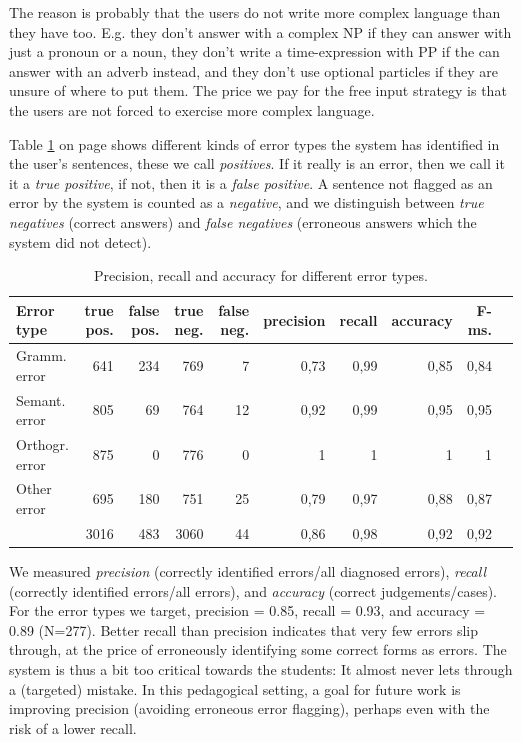 \documentclass[11pt]{article}
\begin{document}
The reason is probably that the users do not write more complex language than they have too. E.g. they don't answer with a complex NP if they can answer with just a pronoun or a noun, they don't write a time-expression with PP if the can answer with an adverb instead, and they don't use optional particles if they are unsure of where to put them. The price we pay for the free input strategy is that the users are not forced to exercise more complex language.

Table \ref{errortypes} on page \pageref{errortypes} shows different kinds of error types the system has identified in the user's sentences, these we call \textit{positives}. If it really is an error, then we call it it a \textit{true positive}, if not, then it is a \textit{false positive}. A sentence not flagged as an error by the system is counted as a \textit{negative}, and we distinguish between \textit{true negatives} (correct answers) and \textit{false negatives} (erroneous answers which the system did not detect).

\begin{table}[hbtp]
\begin{center}
\begin{tabular}{|l|r|r|r|r||r|r|r|r|r|}
\hline
Error type	& true pos.		& false pos.		& true neg.		& false neg.	& precision	 & recall	& accuracy	& F-ms. \\
\hline
Gramm. error    &   641   &   234   &   769    &   7    &   0,73   &   0,99   &   0,85   &   0,84	  \\
Semant. error       &   805   &   69    &   764    &   12   &   0,92   &   0,99   &   0,95   &   0,95		  \\
Orthogr. error      &   875   &   0     &   776    &   0    &   1      &   1      &   1      &   1					  \\
Other error     &   695   &   180   &   751    &   25   &   0,79   &   0,97   &   0,88   &   0,87	  \\
\hline
  &   3016  &   483   &   3060   &   44   &   0,86   &   0,98   &   0,92   &   0,92			  \\
\hline
\end{tabular}
\caption{Precision, recall and accuracy for different error types.}
\label{errortypes}
\end{center}
\end{table}%

We measured \textit{precision} (correctly identified errors/all diagnosed errors), \textit{recall} (correctly identified errors/all errors), and \textit{accuracy} (correct judgements/cases). For the error types we target, precision = 0.85, recall = 0.93, and accuracy = 0.89 (N=277). Better recall than precision indicates that very few errors slip through, at the price of erroneously identifying some correct forms as errors. The system is thus a bit too critical towards the students: It almost never lets through a (targeted) mistake. In this pedagogical setting, a goal for future work is improving precision (avoiding erroneous error flagging), perhaps even with the risk of a lower recall.
 
\end{document}
